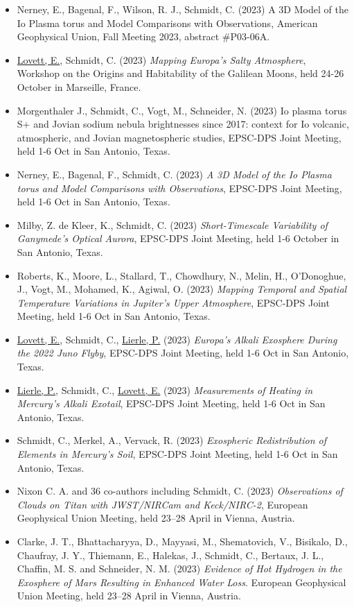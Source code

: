 \documentclass[12pt]{report}
\begin{document}
\begin{itemize}
   \item Nerney, E., Bagenal, F., Wilson, R. J., Schmidt, C. (2023) A 3D Model of the Io Plasma torus and Model Comparisons with Observations, American Geophysical Union, Fall Meeting 2023, abstract \#P03-06A. 
   \item \underline{Lovett, E.}, Schmidt, C. (2023) \textit{Mapping Europa's Salty Atmosphere}, Workshop on the Origins and Habitability of the Galilean Moons, held 24-26 October in Marseille, France.
   \item Morgenthaler J., Schmidt, C., Vogt, M., Schneider, N. (2023) Io plasma torus S+ and Jovian sodium nebula brightnesses since 2017: context for Io volcanic, atmospheric, and Jovian magnetospheric studies, EPSC-DPS Joint Meeting, held 1-6 Oct in San Antonio, Texas.	
   \item Nerney, E., Bagenal, F., Schmidt, C. (2023) \textit{A 3D Model of the Io Plasma torus and Model Comparisons with Observations}, EPSC-DPS Joint Meeting, held 1-6 Oct in San Antonio, Texas.
   \item Milby, Z. de Kleer, K., Schmidt, C. (2023) \textit{Short-Timescale Variability of Ganymede's Optical Aurora}, EPSC-DPS Joint Meeting, held 1-6 October in San Antonio, Texas.	
   \item Roberts, K., Moore, L., Stallard, T., Chowdhury, N., Melin, H., O'Donoghue, J., Vogt, M., Mohamed, K., Agiwal, O. (2023) \textit{Mapping Temporal and Spatial Temperature Variations in Jupiter’s Upper Atmosphere}, EPSC-DPS Joint Meeting, held 1-6 Oct in San Antonio, Texas.	
   \item \underline{Lovett, E.}, Schmidt, C., \underline{Lierle, P.} (2023) \textit{Europa's Alkali Exosphere During the 2022 Juno Flyby}, EPSC-DPS Joint Meeting, held 1-6 Oct in San Antonio, Texas.	
   \item \underline{Lierle, P.}, Schmidt, C., \underline{Lovett, E.} (2023) \textit{Measurements of Heating in Mercury's Alkali Exotail}, EPSC-DPS Joint Meeting, held 1-6 Oct in San Antonio, Texas.
   \item Schmidt, C., Merkel, A., Vervack, R. (2023) \textit{Exospheric Redistribution of Elements in Mercury’s Soil}, EPSC-DPS Joint Meeting, held 1-6 Oct in San Antonio, Texas.
   \item Nixon C. A. and 36 co-authors including Schmidt, C. (2023) \textit{Observations of Clouds on Titan with JWST/NIRCam and Keck/NIRC-2}, European Geophysical Union Meeting, held 23–28 April in Vienna, Austria.
   \item Clarke, J. T., Bhattacharyya, D., Mayyasi, M., Shematovich, V., Bisikalo, D., Chaufray, J. Y., Thiemann, E., Halekas, J., Schmidt, C., Bertaux, J. L., Chaffin, M. S. and Schneider, N. M. (2023) \textit{Evidence of Hot Hydrogen in the Exosphere of Mars Resulting in Enhanced Water Loss}. European Geophysical Union Meeting, held 23–28 April in Vienna, Austria.

\end{itemize}
\end{document}
